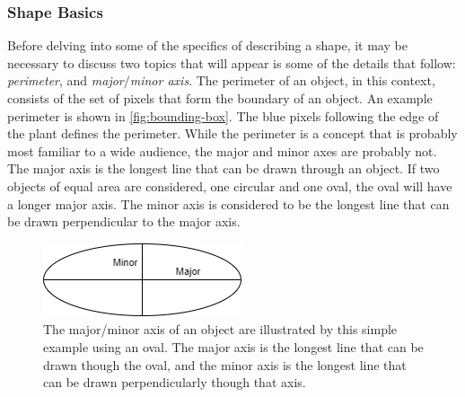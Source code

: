 \documentclass[letterpaper]{article}
\begin{document}
{{\subsubsection{Shape Basics}
Before delving into some of the specifics of describing a shape, it may be necessary to discuss two topics that will appear is some of the details that follow: \textit{perimeter}, and \textit{major$/$minor axis}. The perimeter of an object, in this context, consists of the set of pixels that form the boundary of an object. An example perimeter is shown in \ref{fig:bounding-box}. The blue pixels following the edge of the plant defines the perimeter. While the perimeter is a concept that is probably most familiar to a wide audience, the major and minor axes are probably not. The major axis is the longest line that can be drawn through an object. If two objects of equal area are considered, one circular and one oval, the oval will have a longer major axis. The minor axis is considered to be the longest line that can be drawn perpendicular to the major axis.

\begin{figure}[h!]
	\centering
	\includegraphics[scale=0.4]{./figures/shape-major-minor.png}
	\caption[Major/Minor Axis]{The major/minor axis of an object are illustrated by this simple example using an oval. The major axis is the longest line that can be drawn though the oval, and the minor axis is the longest line that can be drawn perpendicularly though that axis.}
	\label{fig:major-minor}
\end{figure}


}}
\end{document}
